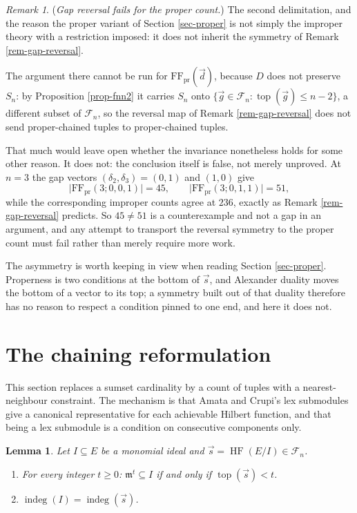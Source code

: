 \documentclass[11pt, a4paper, abstract=yes]{scrartcl}
\theoremstyle{definition}
\theoremstyle{remark}
\newtheorem{remark}[definition]{Remark}
\theoremstyle{plain}
\newtheorem{lemma}[definition]{Lemma}
\newcommand{\indeg}{\operatorname{indeg}}
\newcommand{\tp}{\operatorname{top}}
\newcommand{\HF}{\operatorname{HF}}
\begin{document}
\begin{remark}
(\emph{Gap reversal fails for the proper count.}) The second delimitation, and the reason the proper
variant of Section \ref{sec-proper} is not simply the improper theory with a restriction imposed: it
does not inherit the symmetry of Remark \ref{rem-gap-reversal}.

The argument there cannot be run for \(\mathrm{FF}_{\mathrm{pr}}(\vec d)\), because \(D\) does not
preserve \(S_n\): by Proposition \ref{prop-fnn2} it carries \(S_n\) onto
\(\lbrace\vec g\in\mathcal F_n:\tp(\vec g)\le n-2\rbrace\), a different subset of \(\mathcal F_n\), so
the reversal map of Remark \ref{rem-gap-reversal} does not send proper-chained tuples to proper-chained
tuples.

That much would leave open whether the invariance nonetheless holds for some other reason. It does
not: the conclusion itself is false, not merely unproved. At \(n=3\) the gap vectors
\((\delta_2,\delta_3)=(0,1)\) and \((1,0)\) give
\begin{equation}\label{eq:proper-not-reversible}
  \lvert\mathrm{FF}_{\mathrm{pr}}(3;0,0,1)\rvert=45,
  \qquad
  \lvert\mathrm{FF}_{\mathrm{pr}}(3;0,1,1)\rvert=51,
\end{equation}
while the corresponding improper counts agree at \(236\), exactly as Remark
\ref{rem-gap-reversal} predicts. So \(45\ne51\) is a counterexample and not a gap in an argument, and
any attempt to transport the reversal symmetry to the proper count must fail rather than merely
require more work.

The asymmetry is worth keeping in view when reading Section \ref{sec-proper}. Properness is two
conditions at the bottom of \(\vec s\), and Alexander duality moves the bottom of a vector to its
top; a symmetry built out of that duality therefore has no reason to respect a condition pinned to
one end, and here it does not.
\label{rem-proper-not-reversible}
\end{remark}
\section{The chaining reformulation}
\label{sec-chaining}
This section replaces a sumset cardinality by a count of tuples with a nearest-neighbour constraint.
The mechanism is that Amata and Crupi's lex submodules give a canonical representative for each
achievable Hilbert function, and that being a lex submodule is a condition on consecutive components
only.

\begin{lemma}
Let \(I\subseteq E\) be a monomial ideal and \(\vec s=\HF(E/I)\in\mathcal F_n\).
\begin{enumerate}
\item For every integer \(t\ge0\): \(\mathfrak m^t\subseteq I\) if and only if \(\tp(\vec s)<t\).
\item \(\indeg(I)=\indeg(\vec s)\).
\end{enumerate}
\label{lem-dictionary}
\end{lemma}
\end{document}
